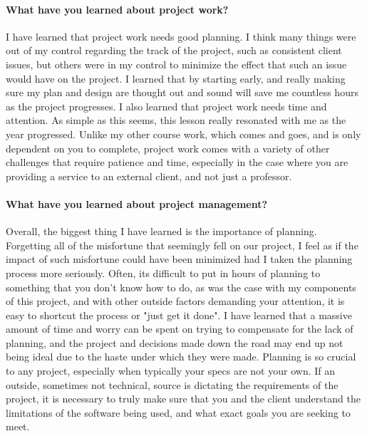 \documentclass{article}
\begin{document}
\paragraph{What have you learned about project work?}
I have learned that project work needs good planning. I think many things were out of my control regarding the track of the project, such as consistent client issues, but others were in my control to minimize the effect that such an issue would have on the project. I learned that by starting early, and really making sure my plan and design are thought out and sound will save me countless hours as the project progresses. I also learned that project work needs time and attention. As simple as this seems, this lesson really resonated with me as the year progressed. Unlike my other course work, which comes and goes, and is only dependent on you to complete, project work comes with a variety of other challenges that require patience and time, especially in the case where you are providing a service to an external client, and not just a professor.
\paragraph{What have you learned about project management?}
Overall, the biggest thing I have learned is the importance of planning. Forgetting all of the misfortune that seemingly fell on our project, I feel as if the impact of such misfortune could have been minimized had I taken the planning process more seriously. Often, its difficult to put in hours of planning to something that you don't know how to do, as was the case with my components of this project, and with other outside factors demanding your attention, it is easy to shortcut the process or "just get it done". I have learned that a massive amount of time and worry can be spent on trying to compensate for the lack of planning, and the project and decisions made down the road may end up not being ideal due to the haste under which they were made. Planning is so crucial to any project, especially when typically your specs are not your own. If an outside, sometimes not technical, source is dictating the requirements of the project, it is necessary to truly make sure that you and the client understand the limitations of the software being used, and what exact goals you are seeking to meet.
\end{document}
